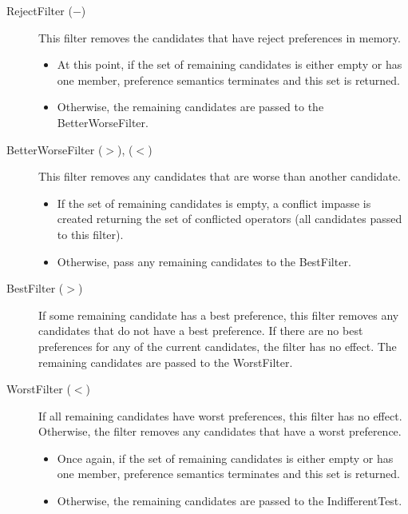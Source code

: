 \begin{description}
\item[RejectFilter ($-$) ] This filter removes the candidates that have
	reject preferences in memory. 
	\begin{itemize}
	\item At this point, if the set of remaining candidates is either empty or has one
	member, preference semantics terminates and this set is returned.
	\item Otherwise, the remaining candidates are passed to the
	BetterWorseFilter.
	\end{itemize}
\index{-}

\item[BetterWorseFilter ($>$), ($<$) ] This filter removes any candidates that are worse
	than another candidate.
\begin{itemize}
\item If the set of remaining candidates is empty, a conflict impasse is created
	returning the set of conflicted operators (all candidates passed to this filter).
\item Otherwise, pass any remaining candidates to the BestFilter.
\end{itemize}
\index{<}
\index{>}


\item[BestFilter ($>$) ] If some remaining candidate has a best preference,
	this filter removes any candidates that do not have
	a best preference. If there are no best preferences for any of the current
	candidates, the filter has no effect. The remaining candidates are passed
	to the WorstFilter.

\item[WorstFilter ($<$) ] If all remaining candidates have worst preferences, this filter
	has no effect. Otherwise, the filter removes any candidates that have
	a worst preference.
	\begin{itemize}
	\item Once again, if the set of remaining candidates is either empty or has one
	member, preference semantics terminates and this set is returned.
	\item Otherwise, the remaining candidates are passed to the
	IndifferentTest.
	\end{itemize}


\end{description}
